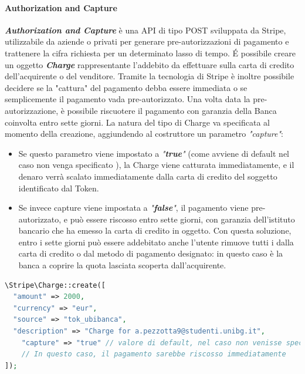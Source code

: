\paragraph{Authorization and Capture}
\textbf{\textit{Authorization and Capture}} è una API di tipo POST sviluppata da Stripe, utilizzabile da aziende o privati per generare pre-autorizzazioni di pagamento e trattenere la cifra richiesta per un determinato lasso di tempo. \'E possibile creare un oggetto \textbf{\textit{Charge}} rappresentante l'addebito da effettuare sulla carta di credito dell'acquirente o del venditore. Tramite la tecnologia di Stripe è inoltre possibile decidere se la "cattura" del pagamento debba essere immediata o se semplicemente il pagamento vada pre-autorizzato. Una volta data la pre-autorizzazione, è possibile riscuotere il pagamento con garanzia della Banca coinvolta entro sette giorni. La natura del tipo di Charge va specificata al momento della creazione, aggiundendo al costruttore un parametro \textit{"capture"}: 
\begin{itemize}
\item Se questo parametro viene impostato a \textit{"\textbf{true}"} (come avviene di default nel caso non venga specificato \cite{stripedoc}), la Charge viene catturata immediatamente, e il denaro verrà scalato immediatamente dalla carta di credito del soggetto identificato dal Token. 
\item Se invece capture viene impostata a \textit{"\textbf{false}"}, il pagamento viene pre-autorizzato, e può essere riscosso entro sette giorni, con garanzia dell'istituto bancario che ha emesso la carta di credito in oggetto. Con questa soluzione, entro i sette giorni può essere addebitato anche l'utente rimuove tutti i dalla carta di credito o dal metodo di pagamento designato: in questo caso è la banca a coprire la quota lasciata scoperta dall'acquirente. 
\end{itemize}

\begin{lstlisting}[language=PHP, caption={creazione di un oggetto Charge, che verrà poi utilizzato catturare il pagamento corrispondente, con cattura immediata}]
\Stripe\Charge::create([
  "amount" => 2000,
  "currency" => "eur",
  "source" => "tok_ubibanca", 
  "description" => "Charge for a.pezzotta9@studenti.unibg.it",
	"capture" => "true" // valore di default, nel caso non venisse specificato
	// In questo caso, il pagamento sarebbe riscosso immediatamente
]);
\end{lstlisting}

